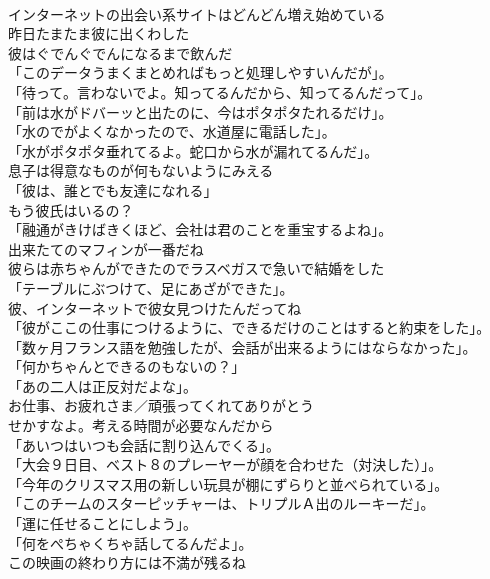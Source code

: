 \documentclass[8pt]{extreport}
\begin{document}
\begin{CJK}{UTF8}{min}
\\	インターネットの出会い系サイトはどんどん増え始めている	
\\	昨日たまたま彼に出くわした	
\\	彼はぐでんぐでんになるまで飲んだ	
\\	「このデータうまくまとめればもっと処理しやすいんだが」。	
\\	「待って。言わないでよ。知ってるんだから、知ってるんだって」。	
\\	「前は水がドバーッと出たのに、今はポタポタたれるだけ」。 
\\	「水のでがよくなかったので、水道屋に電話した」。	
\\	「水がポタポタ垂れてるよ。蛇口から水が漏れてるんだ」。	
\\	息子は得意なものが何もないようにみえる	
\\	「彼は、誰とでも友達になれる」	
\\	もう彼氏はいるの？	
\\	「融通がきけばきくほど、会社は君のことを重宝するよね」。	
\\	出来たてのマフィンが一番だね	
\\	彼らは赤ちゃんができたのでラスベガスで急いで結婚をした	
\\	「テーブルにぶつけて、足にあざができた」。	
\\	彼、インターネットで彼女見つけたんだってね	
\\	「彼がここの仕事につけるように、できるだけのことはすると約束をした」。	
\\	「数ヶ月フランス語を勉強したが、会話が出来るようにはならなかった」。	
\\	「何かちゃんとできるのもないの？」	
\\	「あの二人は正反対だよな」。	
\\	お仕事、お疲れさま／頑張ってくれてありがとう	
\\	せかすなよ。考える時間が必要なんだから	
\\	「あいつはいつも会話に割り込んでくる」。	
\\	「大会９日目、ベスト８のプレーヤーが顔を合わせた（対決した）」。	
\\	「今年のクリスマス用の新しい玩具が棚にずらりと並べられている」。	
\\	「このチームのスターピッチャーは、トリプルＡ出のルーキーだ」。	
\\	「運に任せることにしよう」。	
\\	「何をぺちゃくちゃ話してるんだよ」。	
\\	この映画の終わり方には不満が残るね	

\end{CJK}
\end{document}
